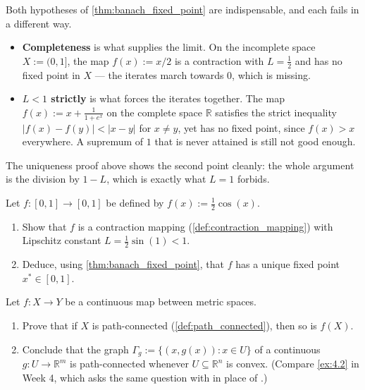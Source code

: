 \begin{remark}
\label{rem:banach_hypotheses}
Both hypotheses of \cref{thm:banach_fixed_point} are indispensable, and each fails in a
different way.
\begin{itemize}
  \item \textbf{Completeness} is what supplies the limit. On the incomplete space
    $X := (0,1]$, the map $f(x) := x/2$ is a contraction with $L=\tfrac12$ and has no fixed
    point in $X$ --- the iterates march towards $0$, which is missing.
  \item \textbf{$L<1$ strictly} is what forces the iterates together. The map
    $f(x) := x + \tfrac{1}{1+e^{x}}$ on the complete space $\mathbb{R}$ satisfies the strict
    inequality $|f(x)-f(y)| < |x-y|$ for $x \neq y$, yet has no fixed point, since
    $f(x)>x$ everywhere. A supremum of $1$ that is never attained is still not good enough.
\end{itemize}
The uniqueness proof above shows the second point cleanly: the whole argument is the division by
$1-L$, which is exactly what $L=1$ forbids.
\end{remark}

\begin{aiexercise}
\label{ex:ai_contraction_cos}
Let $f \colon [0,1] \to [0,1]$ be defined by $f(x) := \frac{1}{2}\cos(x)$.
\begin{enumerate}[label=\textbf{(\alph*)}]
  \item Show that $f$ is a contraction mapping (\cref{def:contraction_mapping}) with Lipschitz
    constant $L = \frac{1}{2}\sin(1) < 1$.
  \item Deduce, using \cref{thm:banach_fixed_point}, that $f$ has a unique fixed point
    $x^* \in [0,1]$.
\end{enumerate}
\end{aiexercise}

\begin{aiexercise}
\label{ex:ai_connected_image}
Let $f \colon X \to Y$ be a continuous map between metric spaces.
\begin{enumerate}[label=\textbf{(\alph*)}]
  \item Prove that if $X$ is path-connected (\cref{def:path_connected}), then so is $f(X)$.
  \item Conclude that the graph $\Gamma_g := \{(x,g(x)) : x \in U\}$ of a continuous
    $g : U \to \mathbb{R}^m$ is path-connected whenever $U \subseteq \mathbb{R}^n$ is convex.
    (Compare \cref{ex:4.2} in Week 4, which asks the same question with  in place
    of .)
\end{enumerate}
\end{aiexercise}

